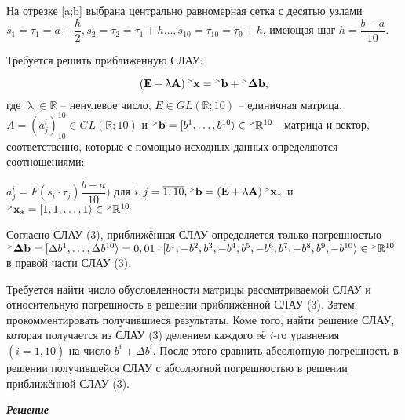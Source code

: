 \documentclass[12pt]{article}
\begin{document}
На отрезке [a;b] выбрана центрально равномерная сетка с десятью узлами 
$s_1 = \tau_1 = a + \dfrac{h}{2}, s_2 = \tau_2 =  \tau_1 + h
\dots, s_{10} = \tau_{10} = \tau_9 + h$,
имеющая шаг  $h= \dfrac{b-a}{10}$.

Требуется решить приближенную СЛАУ:

\begin{equation}
\mathbf{\left(E + \uplambda A  \right) {}^{\mathsmaller{>}} x = 
{}^{\mathsmaller{>}} b + {}^{\mathsmaller{>}} \Delta b ,}
\end{equation}
где $ \uplambda \in \mathbb{R} $ – ненулевое число, 
$ E \in GL(\mathbb{R};10) $ – единичная матрица,
$ A = (a^i_j)^{10}_{10} \in GL(\mathbb{R};10) $  и 
$ \mathbf{^{\mathsmaller{>}} b} = [b^1,\dots,b^{10}\rangle \in \mathbf{^{\mathsmaller{>}}}
\mathbb{R}^{10}$ - матрица и вектор, соответственно,
которые с помощью исходных данных определяются соотношениями: 

$ a^i_j=F(s_i \cdot \tau_j)\dfrac{b-a}{10}) $ для 
$ i,j = \overline{1,10}, 
\mathbf{
	{}^{\mathsmaller{>}} b = \left(E + \uplambda A  \right) {}^{\mathsmaller{>}} x_*}
$ и 
$ \mathbf{{}^{\mathsmaller{>}} x_*} = [1,1,\dots,1\rangle \in {}^{\mathsmaller{>}}
	\mathbb{R}^{10}
$

Согласно СЛАУ (3), приближённая СЛАУ определяется только погрешностью
$\mathbf{{}^{\mathsmaller{>}} \Delta b} = [\Delta b^1,\dots,\Delta b^{10}\rangle = 
0,01 \cdot [b^1,-b^2,b^3,-b^4,b^5,-b^6,b^7,-b^8,b^9,-b^{10}\rangle \in  
{}^{\mathsmaller{>}} \mathbb{R}^{10}$ в правой части
СЛАУ (3).

Требуется найти число обусловленности матрицы рассматриваемой СЛАУ и
относительную погрешность в решении приближённой СЛАУ (3). Затем,
прокомментировать получившиеся результаты. Коме того, найти решение СЛАУ, которая
получается из СЛАУ (3) делением каждого eё $i$-го уравнения $(i=\overline{1,10})$
на число
$b^i + \Delta b^i $. 
После этого сравнить абсолютную погрешность в решении получившейся СЛАУ с
абсолютной погрешностью в решении приближённой СЛАУ (3).

\begin{center}
	\textbf{\textit{Решение}}
\end{center}
\end{document}
